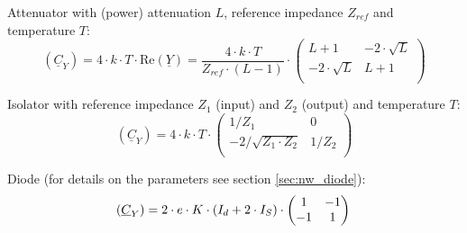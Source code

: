 Attenuator with (power) attenuation $L$, reference impedance $Z_{ref}$
and temperature $T$:
\begin{equation}
(\underline{C}_Y) = 4\cdot k\cdot T\cdot \text{Re}\left(\underline{Y}\right)
 = \frac{4\cdot k\cdot T}{Z_{ref}\cdot (L-1)} \cdot
\begin{pmatrix}
 L+1            & -2\cdot\sqrt{L} \\
-2\cdot\sqrt{L} &  L+1 \\
\end{pmatrix}
\end{equation}

Isolator with reference impedance $Z_1$ (input) and $Z_2$ (output) and
temperature $T$:
\begin{equation}
(\underline{C}_Y) = 4\cdot k\cdot T\cdot
\begin{pmatrix}
 1/Z_1                 & 0 \\
-2/\sqrt{Z_1\cdot Z_2} &  1/Z_2 \\
\end{pmatrix}
\end{equation}

Diode (for details on the parameters see section \ref{sec:nw_diode}):
\begin{equation}
(\underline{C}_Y)
 = 2\cdot e\cdot K\cdot \left(I_{d} + 2\cdot I_{S}\right)\cdot
\begin{pmatrix}
   1 & -1\\
  -1 &  1\\
\end{pmatrix}\\
\end{equation}
